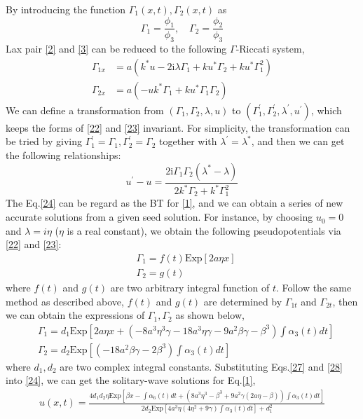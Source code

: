 \documentclass[12pt]{article}
\begin{document}
By introducing the function $\Gamma_{1}(x,t), \Gamma_{2}(x,t)$ as
\begin{equation}
  \Gamma_{1} = \frac{\phi_{1}}{\phi_{3}}, \quad \Gamma_{2} = \frac{\phi_{2}}{\phi_{3}}
\end{equation}
Lax pair \eqref{2} and \eqref{3} can be reduced to the following $\Gamma$-Riccati system,
\begin{align}
  \Gamma_{1x} &= a(k^{*}u - 2\mathrm{i}\lambda \Gamma_{1} + ku^{*}\Gamma_{2} + ku^{*}\Gamma_{1}^{2}) \label{22} \\
  \Gamma_{2x} &= a(-uk^{*}\Gamma_{1} + ku^{*}\Gamma_{1}\Gamma_{2})  \label{23}
\end{align}
We can define a transformation from $(\Gamma_{1}, \Gamma_{2}, \lambda, u)$ to $(\Gamma_{1}^{'}, \Gamma_{2}^{'}, \lambda^{'}, u^{'})$, which keeps the forms of \eqref{22} and \eqref{23} invariant. For simplicity, the transformation can be tried by giving $\Gamma_{1}^{'} = \Gamma_{1}, \Gamma_{2}^{'} = \Gamma_{2}$ together with $\lambda^{'} = \lambda^{*}$, and then we can get the following relationships:
\begin{equation}
  u^{'} - u = \frac{2\mathrm{i}\Gamma_{1}\Gamma_{2}(\lambda^{*}-\lambda)}{2k^{*}\Gamma_{2} + k^{*}\Gamma_{1}^{2}} \label{24}
\end{equation}
The Eq.\eqref{24} can be regard as the BT for \eqref{1}, and we can obtain a series of new accurate solutions from a given seed solution. For instance, by choosing $u_{0} = 0$ and $\lambda = i\eta$ ($\eta$ is a real constant), we obtain the following pseudopotentials via \eqref{22} and \eqref{23}:
\begin{align}
  & \Gamma_{1} = f(t)\mathrm{Exp}[2a\eta x] \\
  & \Gamma_{2} = g(t)
\end{align}
where $f(t)$ and $g(t)$ are two arbitrary integral function of $t$. Follow the same method as described above, $f(t)$ and $g(t)$ are determined by $\Gamma_{1t}$ and $\Gamma_{2t}$, then we can obtain the expressions of $\Gamma_{1}, \Gamma_{2}$ as shown below,
\begin{align}
  & \Gamma_{1} = d_{1}\mathrm{Exp}\left[2a\eta x + \left(-8a^3\eta^3\gamma-18a^3\eta \gamma-9a^2\beta\gamma - \beta^3\right)\int \alpha_{3}(t)dt\right] \label{27}\\
  & \Gamma_{2} = d_{2}\mathrm{Exp}\left[\left(-18a^2\beta \gamma-2\beta^3\right)\int \alpha_{3}(t)dt\right] \label{28}
\end{align}
where $d_{1}, d_{2}$ are two complex integral constants. Substituting Eqs.\eqref{27} and \eqref{28} into \eqref{24}, we can get the solitary-wave solutions for Eq.\eqref{1},
\begin{align}
    u(x,t) = \frac{4d_1d_2\eta\mathrm{Exp}\left[\beta x - \int \alpha_6(t)dt + (8a^3\eta^3-\beta^3+9a^2\gamma(2a\eta-\beta))\int \alpha_3(t)dt\right]}{2d_2 \mathrm{Exp}\left[4a^3\eta(4\eta^2+9\gamma)\int \alpha_3(t)dt\right] + d_1^2}
\end{align}
\end{document}

